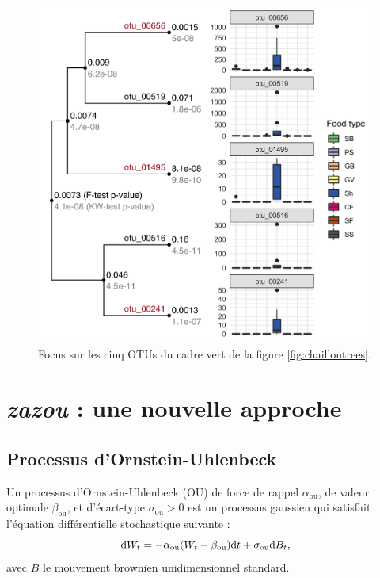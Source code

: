 \documentclass[12pt,a4paper]{reedthesis}
\newcommand \dx [2] [] {\mathrm{d}^{#1}\mspace{-1mu}\mathord{#2}}
\newcommand \ou [1]{{#1}_{\text{ou}}}
\newcommand \optim {\beta}
\theoremstyle{definition}
\theoremstyle{definition}
\theoremstyle{definition}
\theoremstyle{remark}
\begin{document}
\begin{figure}

{\centering \includegraphics[width=0.9\linewidth]{img/chaillou_zoom} 

}

\caption{Focus sur les cinq OTUs du cadre vert de la figure \ref{fig:chailloutrees}.}\label{fig:chaillouzoom}
\end{figure}
\hypertarget{nouvelleapproche}{%
\chapter{\texorpdfstring{\emph{zazou} : une nouvelle approche}{zazou : une nouvelle approche}}\label{nouvelleapproche}}

\hypertarget{ou}{%
\section{Processus d'Ornstein-Uhlenbeck}\label{ou}}

Un processus d'Ornstein-Uhlenbeck (OU) de force de rappel \(\ou{\alpha}\), de valeur optimale \(\ou{\optim}\), et d'écart-type \(\ou{\sigma} > 0\) est un processus gaussien qui satisfait l'équation différentielle stochastique suivante :
\begin{equation*}
\dx{W_t} = - \ou{\alpha} (W_t - \ou{\optim}) \dx{t} + \ou{\sigma}\dx{B_t},
\end{equation*}
avec \(B\) le mouvement brownien unidimensionnel standard.
\end{document}
